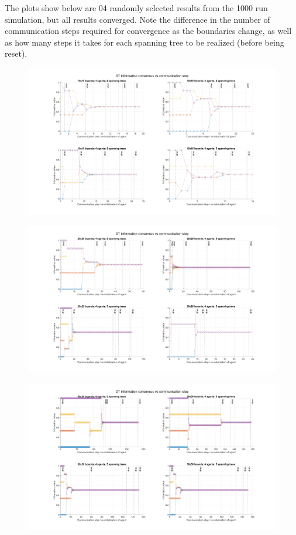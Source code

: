 \documentclass[12pt]{article}
\begin{document}
The plots show below are 04 randomly selected results from the 1000 run simulation, but all results converged. Note the difference in the number of communication steps required for convergence as the boundaries change, as well as how many steps it takes for each spanning tree to be realized (before being reset).

\begin{figure}[H]
	\includegraphics[width=\textwidth]{square10_4agent_5trees.png}
	\centering
\end{figure}

\begin{figure}[H]
	\includegraphics[width=\textwidth]{square20_4agent_5trees.png}
	\centering
\end{figure}

\begin{figure}[H]
	\includegraphics[width=\textwidth]{square30_4agent_5trees.png}
	\centering
\end{figure}
\end{document}
